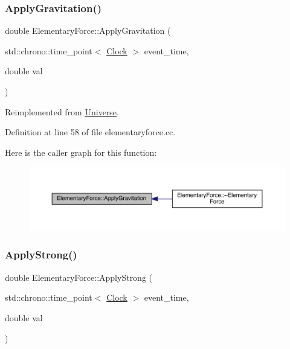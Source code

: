 \subsubsection{\texorpdfstring{Apply\+Gravitation()}{ApplyGravitation()}}
{\footnotesize\ttfamily double Elementary\+Force\+::\+Apply\+Gravitation (\begin{DoxyParamCaption}\item[{std\+::chrono\+::time\+\_\+point$<$ \hyperlink{universe_8h_a0ef8d951d1ca5ab3cfaf7ab4c7a6fd80}{Clock} $>$}]{event\+\_\+time,  }\item[{double}]{val }\end{DoxyParamCaption})\hspace{0.3cm}{\ttfamily [virtual]}}



Reimplemented from \hyperlink{class_universe_a76c0b5e63c2a7d1988c44db341c3d64c}{Universe}.



Definition at line 58 of file elementaryforce.\+cc.

Here is the caller graph for this function\+:
\nopagebreak
\begin{figure}[H]
\begin{center}
\leavevmode
\includegraphics[width=350pt]{class_elementary_force_a655a2c9489bfbbf15e05ba4953628134_icgraph}
\end{center}
\end{figure}
\mbox{\label{class_elementary_force_a8a16bff6b5df2b0ff918262bf6376ade}} 
\subsubsection{\texorpdfstring{Apply\+Strong()}{ApplyStrong()}}
{\footnotesize\ttfamily double Elementary\+Force\+::\+Apply\+Strong (\begin{DoxyParamCaption}\item[{std\+::chrono\+::time\+\_\+point$<$ \hyperlink{universe_8h_a0ef8d951d1ca5ab3cfaf7ab4c7a6fd80}{Clock} $>$}]{event\+\_\+time,  }\item[{double}]{val }\end{DoxyParamCaption})\hspace{0.3cm}{\ttfamily [virtual]}}



